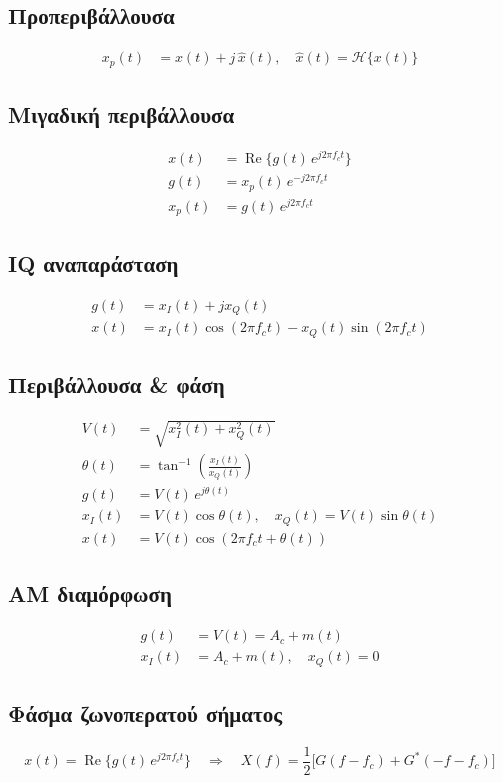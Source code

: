 \documentclass[11pt,a4paper]{article}
\newcommand{\Repart}{\operatorname{Re}}
\newcommand{\Hilbert}{\mathcal{H}}
\begin{document}
\subsection{Προπεριβάλλουσα}
\begin{align}
x_p(t) &= x(t) + j\,\hat{x}(t), \quad \hat{x}(t) = \Hilbert\{x(t)\}
\end{align}

\subsection{Μιγαδική περιβάλλουσα}
\begin{align}
x(t) &= \Repart\{g(t)\,e^{j2\pi f_c t}\} \\
g(t) &= x_p(t)\,e^{-j2\pi f_c t} \\
x_p(t) &= g(t)\,e^{j2\pi f_c t}
\end{align}

\subsection{IQ αναπαράσταση}
\begin{align}
g(t) &= x_I(t) + j x_Q(t) \\
x(t) &= x_I(t)\cos(2\pi f_c t) - x_Q(t)\sin(2\pi f_c t)
\end{align}

\subsection{Περιβάλλουσα \& φάση}
\begin{align}
V(t) &= \sqrt{x_I^2(t) + x_Q^2(t)} \\
\theta(t) &= \tan^{-1}\!\left(\frac{x_I(t)}{x_Q(t)}\right) \\
g(t) &= V(t)\,e^{j\theta(t)} \\
x_I(t) &= V(t)\cos\theta(t), \quad x_Q(t) = V(t)\sin\theta(t) \\
x(t) &= V(t)\cos(2\pi f_c t + \theta(t))
\end{align}

\subsection{AM διαμόρφωση}
\begin{align}
g(t) &= V(t) = A_c + m(t) \\
x_I(t) &= A_c + m(t), \quad x_Q(t) = 0
\end{align}

\subsection{Φάσμα ζωνοπερατού σήματος}
\begin{equation}
x(t) = \Repart\{g(t)\,e^{j2\pi f_c t}\}
\quad \Rightarrow \quad
X(f) = \frac{1}{2}\bigl[G(f-f_c) + G^*(-f-f_c)\bigr]
\end{equation}
\end{document}

